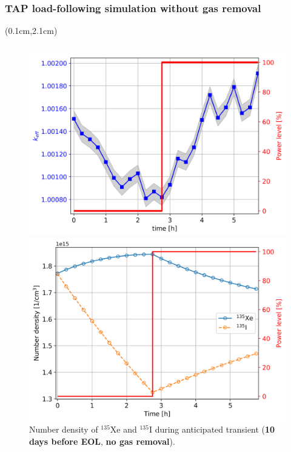 \begin{frame}
\frametitle{TAP load-following simulation without gas removal}
\begin{textblock*}{12.5cm}(0.1cm,2.1cm) %
\begin{columns}
	\column[t]{6.3cm}
	\begin{figure}[t]
		\begin{overprint}
	\includegraphics[width=1.11\linewidth]{../dissertation/figures/ch5/keff_kl_1_eol_eoc_15min.png}
		\vspace{-6mm}
	\caption{$k_{eff}$ dynamics during 2.75-hour shutdown (\textbf{10 days 
		before EOL}, \textbf{no gas removal}). $\sigma\pm7$ $pcm$ is shaded.}
	\includegraphics[width=1.11\linewidth]{../dissertation/figures/ch5/xe_i_kl_1_eol_eoc_15min.png}
		\vspace{-6mm}
	\caption{Number density of $^{135}$Xe and $^{135}$I during anticipated 
	transient (\textbf{10 days before EOL}, \textbf{no gas removal}).}
		\end{overprint}
	\end{figure}
	

\end{columns}
\end{textblock*}
\end{frame}
